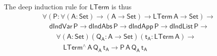 \documentclass[sigplan,screen]{acmart}
\begin{document}
The deep induction rule for $\mathsf{LTerm}$ is thus
\begin{equation}\label{eq:ind-lam}
\begin{array}{l}
\mathsf{\forall (P : \forall (A : Set) \to (A \to Set) \to LTerm\,A
  \to Set) \to}\\
\quad\mathsf{dIndVar\,P \to dIndAbs\,P \to dIndApp\,P \to
  dIndList\,P \to}\\
\quad\quad \mathsf{\forall (A : Set)(Q_A : A \to
  Set)(t_A : LTerm\,A) \to}\\
\quad\quad\quad\mathsf{LTerm^{\wedge}\,A\,Q_A\,t_A \to
  P\,A\,Q_A\,t_A}
\end{array}
\end{equation}




\begin{figure*}[t]

\begin{adjustbox}{varwidth=7.3in, max width=7.1in, margin=-0.0in 0in
      -0.2in 0in, center} 


\end{adjustbox}
\end{figure*}
\end{document}
